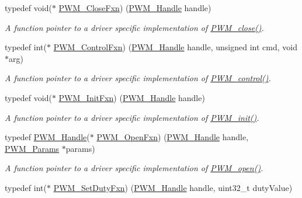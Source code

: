 \begin{DoxyCompactItemize}
typedef void($\ast$ \hyperlink{_p_w_m_8h_a1643d365dfa900197b324ea74035d2ec}{P\+W\+M\+\_\+\+Close\+Fxn}) (\hyperlink{_p_w_m_8h_afdefc765f42bbad4dca246fda6e1354b}{P\+W\+M\+\_\+\+Handle} handle)
\begin{DoxyCompactList}\small\item\em A function pointer to a driver specific implementation of \hyperlink{_p_w_m_8h_a0e0f5899b067d27653db566fb148db11}{P\+W\+M\+\_\+close()}. \end{DoxyCompactList}\item 
typedef int($\ast$ \hyperlink{_p_w_m_8h_af538c912f876c434c62e7e0e28d41b75}{P\+W\+M\+\_\+\+Control\+Fxn}) (\hyperlink{_p_w_m_8h_afdefc765f42bbad4dca246fda6e1354b}{P\+W\+M\+\_\+\+Handle} handle, unsigned int cmd, void $\ast$arg)
\begin{DoxyCompactList}\small\item\em A function pointer to a driver specific implementation of \hyperlink{_p_w_m_8h_ade999f5b12997479efa1ac85aaf46ef5}{P\+W\+M\+\_\+control()}. \end{DoxyCompactList}\item 
typedef void($\ast$ \hyperlink{_p_w_m_8h_a38666ae4b117b81d35758258012b251a}{P\+W\+M\+\_\+\+Init\+Fxn}) (\hyperlink{_p_w_m_8h_afdefc765f42bbad4dca246fda6e1354b}{P\+W\+M\+\_\+\+Handle} handle)
\begin{DoxyCompactList}\small\item\em A function pointer to a driver specific implementation of \hyperlink{_p_w_m_8h_aadae3fe77e36cbf9643a22eeb99fb01e}{P\+W\+M\+\_\+init()}. \end{DoxyCompactList}\item 
typedef \hyperlink{_p_w_m_8h_afdefc765f42bbad4dca246fda6e1354b}{P\+W\+M\+\_\+\+Handle}($\ast$ \hyperlink{_p_w_m_8h_a16b7b446398f8b90e4fa287c6e4a0981}{P\+W\+M\+\_\+\+Open\+Fxn}) (\hyperlink{_p_w_m_8h_afdefc765f42bbad4dca246fda6e1354b}{P\+W\+M\+\_\+\+Handle} handle, \hyperlink{struct_p_w_m___params}{P\+W\+M\+\_\+\+Params} $\ast$params)
\begin{DoxyCompactList}\small\item\em A function pointer to a driver specific implementation of \hyperlink{_p_w_m_8h_ac963beab0c5c6901bf852f175028aeaf}{P\+W\+M\+\_\+open()}. \end{DoxyCompactList}\item 
typedef int($\ast$ \hyperlink{_p_w_m_8h_a052016271d09bd468dddff3168dd46de}{P\+W\+M\+\_\+\+Set\+Duty\+Fxn}) (\hyperlink{_p_w_m_8h_afdefc765f42bbad4dca246fda6e1354b}{P\+W\+M\+\_\+\+Handle} handle, uint32\+\_\+t duty\+Value)

\end{DoxyCompactItemize}
